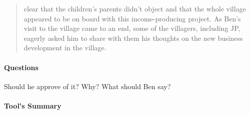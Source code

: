 \begin{quote}
clear that the children's parents didn't object and that the whole village appeared to be on board with this income-producing project. As Ben's visit to the village came to an end, some of the villagers, including JP, eagerly asked him to share with them his thoughts on the new business development in the village.
\end{quote}

\paragraph{Questions}{
  Should he approve of it? Why? What should Ben say?
}

\paragraph{Tool's Summary}{

}
